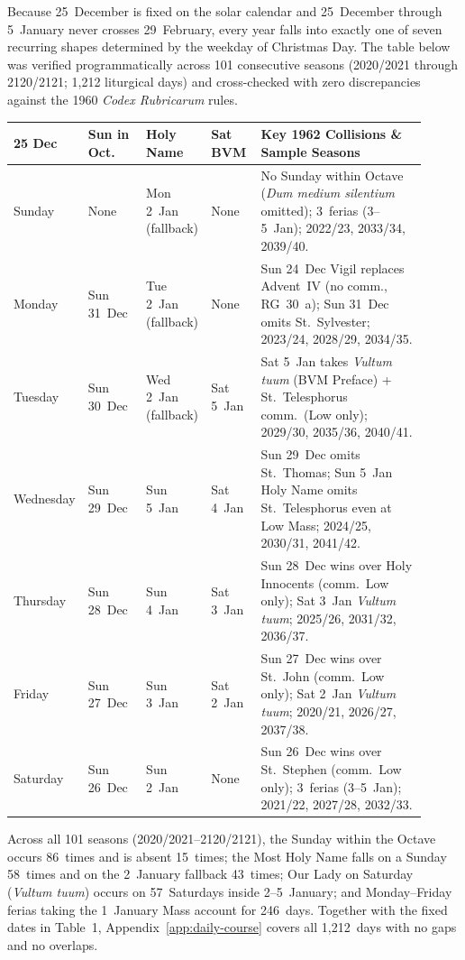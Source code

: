 Because 25~December is fixed on the solar calendar and 25~December through
5~January never crosses 29~February, every year falls into exactly one of seven
recurring shapes determined by the weekday of Christmas Day. The table below was
verified programmatically across 101 consecutive seasons (2020/2021 through
2120/2121; 1,212 liturgical days) and cross-checked with zero discrepancies
against the 1960 \textit{Codex Rubricarum} rules.

{\footnotesize
\begin{longtable}{>{\raggedright\arraybackslash}p{0.10\linewidth}>{\raggedright\arraybackslash}p{0.14\linewidth}>{\raggedright\arraybackslash}p{0.15\linewidth}>{\raggedright\arraybackslash}p{0.12\linewidth}>{\raggedright\arraybackslash}p{0.40\linewidth}}
\toprule
\textbf{25 Dec} & \textbf{Sun in Oct.} & \textbf{Holy Name} & \textbf{Sat BVM} & \textbf{Key 1962 Collisions \& Sample Seasons}\\
\midrule
\endhead
Sunday & None & Mon 2~Jan (fallback) & None & No Sunday within Octave (\textit{Dum medium silentium} omitted); 3~ferias (3--5~Jan); 2022/23, 2033/34, 2039/40.\\
Monday & Sun 31~Dec & Tue 2~Jan (fallback) & None & Sun 24~Dec Vigil replaces Advent~IV (no comm., RG~30~a); Sun 31~Dec omits St.~Sylvester; 2023/24, 2028/29, 2034/35.\\
Tuesday & Sun 30~Dec & Wed 2~Jan (fallback) & Sat 5~Jan & Sat 5~Jan takes \textit{Vultum tuum} (BVM Preface) + St.~Telesphorus comm.\ (Low only); 2029/30, 2035/36, 2040/41.\\
Wednesday & Sun 29~Dec & Sun 5~Jan & Sat 4~Jan & Sun 29~Dec omits St.~Thomas; Sun 5~Jan Holy Name omits St.~Telesphorus even at Low Mass; 2024/25, 2030/31, 2041/42.\\
Thursday & Sun 28~Dec & Sun 4~Jan & Sat 3~Jan & Sun 28~Dec wins over Holy Innocents (comm.\ Low only); Sat 3~Jan \textit{Vultum tuum}; 2025/26, 2031/32, 2036/37.\\
Friday & Sun 27~Dec & Sun 3~Jan & Sat 2~Jan & Sun 27~Dec wins over St.~John (comm.\ Low only); Sat 2~Jan \textit{Vultum tuum}; 2020/21, 2026/27, 2037/38.\\
Saturday & Sun 26~Dec & Sun 2~Jan & None & Sun 26~Dec wins over St.~Stephen (comm.\ Low only); 3~ferias (3--5~Jan); 2021/22, 2027/28, 2032/33.\\
\bottomrule
\end{longtable}
}

Across all 101 seasons (2020/2021--2120/2121), the Sunday within the Octave
occurs 86~times and is absent 15~times; the Most Holy Name falls on a Sunday
58~times and on the 2~January fallback 43~times; Our Lady on Saturday
(\textit{Vultum tuum}) occurs on 57~Saturdays inside 2--5~January; and
Monday--Friday ferias taking the 1~January Mass account for 246~days. Together
with the fixed dates in Table~1, Appendix~\ref{app:daily-course} covers all
1,212~days with no gaps and no overlaps.

